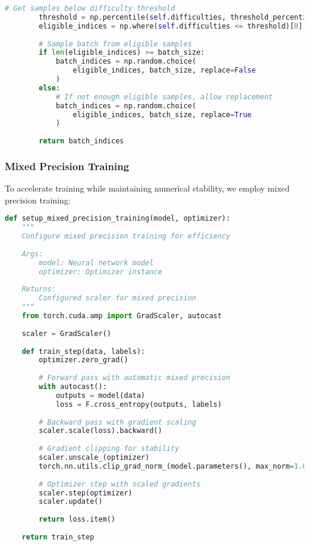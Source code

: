 \documentclass[journal]{IEEEtran}
\begin{document}
\begin{lstlisting}[language=Python, caption=Curriculum Learning Implementation]
        # Get samples below difficulty threshold
        threshold = np.percentile(self.difficulties, threshold_percentile)
        eligible_indices = np.where(self.difficulties <= threshold)[0]
        
        # Sample batch from eligible samples
        if len(eligible_indices) >= batch_size:
            batch_indices = np.random.choice(
                eligible_indices, batch_size, replace=False
            )
        else:
            # If not enough eligible samples, allow replacement
            batch_indices = np.random.choice(
                eligible_indices, batch_size, replace=True
            )
        
        return batch_indices
\end{lstlisting}

\subsubsection{Mixed Precision Training}

To accelerate training while maintaining numerical stability, we employ mixed precision training:

\begin{lstlisting}[language=Python, caption=Mixed Precision Training Setup]
def setup_mixed_precision_training(model, optimizer):
    """
    Configure mixed precision training for efficiency
    
    Args:
        model: Neural network model
        optimizer: Optimizer instance
    
    Returns:
        Configured scaler for mixed precision
    """
    from torch.cuda.amp import GradScaler, autocast
    
    scaler = GradScaler()
    
    def train_step(data, labels):
        optimizer.zero_grad()
        
        # Forward pass with automatic mixed precision
        with autocast():
            outputs = model(data)
            loss = F.cross_entropy(outputs, labels)
        
        # Backward pass with gradient scaling
        scaler.scale(loss).backward()
        
        # Gradient clipping for stability
        scaler.unscale_(optimizer)
        torch.nn.utils.clip_grad_norm_(model.parameters(), max_norm=1.0)
        
        # Optimizer step with scaled gradients
        scaler.step(optimizer)
        scaler.update()
        
        return loss.item()
    
    return train_step
\end{lstlisting}
\end{document}
